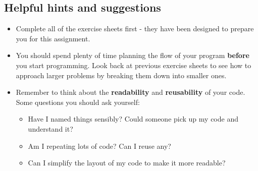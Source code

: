 \documentclass[11pt]{report}
\begin{document}
\subsection*{Helpful hints and suggestions}
\begin{itemize}
    \item Complete all of the exercise sheets first - they have been designed to prepare you for this assignment.
	\item You should spend plenty of time planning the flow of your program \textbf{before} you start programming. Look back at previous exercise sheets to see how to approach larger problems by breaking them down into smaller ones.
	\item Remember to think about the \textbf{readability} and \textbf{reusability} of your code. Some questions you should ask yourself:
	\begin{itemize}
		\item Have I named things sensibly? Could someone pick up my code and understand it?
		\item Am I repeating lots of code? Can I reuse any?
		\item Can I simplify the layout of my code to make it more readable? 
	\end{itemize}
	
	

\end{itemize}
\end{document}
